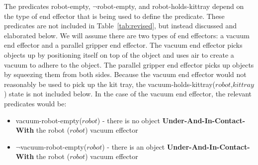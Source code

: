 \documentclass[preprint,12pt]{elsarticle}
\newcommand{\const}[1] {$\mathit{#1}$}
\newcommand{\stvar}[1] {\textsf{#1}}
\begin{document}
The predicates \stvar{robot-empty}, $\neg$\stvar{robot-empty}, and \stvar{robot-holds-kittray} depend on the type of end effector that is being used to define the predicate. These predicates are not included in Table~\ref{tab:revised}, but instead discussed and elaborated below. We will assume there are two types of end effectors: a vacuum end effector and a parallel gripper end effector. The vacuum end effector picks objects up by positioning itself on top of the object and uses air to create a vacuum to adhere to the object. The parallel gripper end effector picks up objects by squeezing them from both sides.  Because the vacuum end effector would not reasonably be used to pick up the kit tray, the \stvar{vacuum-holds-kittray}(\const{robot},\const{kittray}) state is not included below. In the case of the vacuum end effector, the relevant predicates would be:


\begin{itemize}
\item \stvar{vacuum-robot-empty}(\const{robot}) - there is no object \textbf{Under-And-In-Contact-With} the robot (\const{robot}) vacuum effector
\item $\neg$\stvar{vacuum-robot-empty}(\const{robot}) - there is an object \textbf{Under-And-In-Contact-With} the robot (\const{robot}) vacuum effector
\end{itemize}
\end{document}
